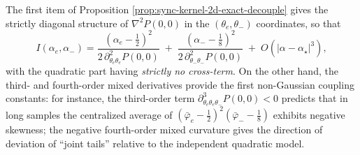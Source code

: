 \begin{remark}\label{rem:sync-kernel-2d-nongaussian-coupling}
The first item of Proposition \ref{prop:sync-kernel-2d-exact-decouple} gives the strictly diagonal structure of
\(
\nabla^2 P(0,0)
\)
in the \((\theta_e,\theta_-)\) coordinates, so that
\[
I(\alpha_e,\alpha_-)
=\frac{(\alpha_e-\frac12)^2}{2\,\partial^2_{\theta_e\theta_e}P(0,0)}
\;+\;
\frac{(\alpha_--\frac18)^2}{2\,\partial^2_{\theta_-\theta_-}P(0,0)}
\;+\;O(|\alpha-\alpha_\star|^3),
\]
with the quadratic part having \emph{strictly no cross-term}.
On the other hand, the third- and fourth-order mixed derivatives provide the first non-Gaussian coupling constants: for instance, the third-order term
\(
\partial^3_{\theta_e\theta_e\theta_-}P(0,0)<0
\)
predicts that in long samples the centralized average of
\(
(\bar\varphi_e-\tfrac12)^2(\bar\varphi_- -\tfrac18)
\)
exhibits negative skewness; the negative fourth-order mixed curvature gives the direction of deviation of ``joint tails'' relative to the independent quadratic model.
\end{remark}

